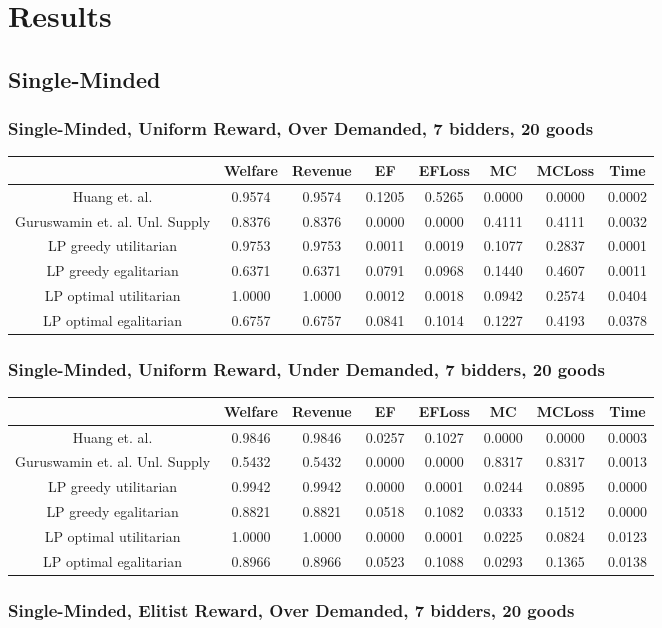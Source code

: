 \section{Results}
\subsection{Single-Minded}
\subsubsection*{Single-Minded, Uniform Reward, Over Demanded, 7 bidders, 20 goods} 
\begin{tabular}{|c|c|c|c|c|c|c|c|}\hline
                            	&Welfare	&Revenue	&EF	&EFLoss	&MC	&MCLoss	&Time	\\\hline
                 Huang et. al.	&0.9574	&0.9574	&0.1205	&0.5265	&0.0000	&0.0000	&0.0002	\\\hline 
Guruswamin et. al. Unl. Supply	&0.8376	&0.8376	&0.0000	&0.0000	&0.4111	&0.4111	&0.0032	\\\hline 
         LP greedy utilitarian	&0.9753	&0.9753	&0.0011	&0.0019	&0.1077	&0.2837	&0.0001	\\\hline 
         LP greedy egalitarian	&0.6371	&0.6371	&0.0791	&0.0968	&0.1440	&0.4607	&0.0011	\\\hline 
        LP optimal utilitarian	&1.0000	&1.0000	&0.0012	&0.0018	&0.0942	&0.2574	&0.0404	\\\hline 
        LP optimal egalitarian	&0.6757	&0.6757	&0.0841	&0.1014	&0.1227	&0.4193	&0.0378	\\\hline 
\end{tabular}\subsubsection*{Single-Minded, Uniform Reward, Under Demanded, 7 bidders, 20 goods} 
\begin{tabular}{|c|c|c|c|c|c|c|c|}\hline
                            	&Welfare	&Revenue	&EF	&EFLoss	&MC	&MCLoss	&Time	\\\hline
                 Huang et. al.	&0.9846	&0.9846	&0.0257	&0.1027	&0.0000	&0.0000	&0.0003	\\\hline 
Guruswamin et. al. Unl. Supply	&0.5432	&0.5432	&0.0000	&0.0000	&0.8317	&0.8317	&0.0013	\\\hline 
         LP greedy utilitarian	&0.9942	&0.9942	&0.0000	&0.0001	&0.0244	&0.0895	&0.0000	\\\hline 
         LP greedy egalitarian	&0.8821	&0.8821	&0.0518	&0.1082	&0.0333	&0.1512	&0.0000	\\\hline 
        LP optimal utilitarian	&1.0000	&1.0000	&0.0000	&0.0001	&0.0225	&0.0824	&0.0123	\\\hline 
        LP optimal egalitarian	&0.8966	&0.8966	&0.0523	&0.1088	&0.0293	&0.1365	&0.0138	\\\hline 
\end{tabular}\subsubsection*{Single-Minded, Elitist Reward, Over Demanded, 7 bidders, 20 goods} 

